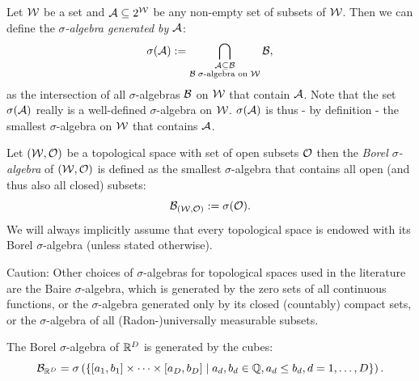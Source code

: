 \begin{Def}
    \label{def-sigma-algebra-gen}
    Let $\mathcal{W}$ be a set and $\mathcal{A} \subseteq 2^{\mathcal{W}}$ be any non-empty set of subsets of $\mathcal{W}$.
    Then we can define the \emph{$\sigma$-algebra generated by $\mathcal{A}$}:
    \[ \sigma(\mathcal{A}) := \bigcap_{\substack{ \mathcal{A} \subseteq \mathcal{B} \\\mathcal{B}\; \sigma\text{-algebra on }\mathcal{W} }} \mathcal{B}, \]
    as the intersection of all $\sigma$-algebras $\mathcal{B}$ on $\mathcal{W}$ that contain $\mathcal{A}$. 
    Note that the set $\sigma(\mathcal{A})$ really is a well-defined $\sigma$-algebra on $\mathcal{W}$. %
    $\sigma(\mathcal{A})$ is thus - by definition - the smallest $\sigma$-algebra on $\mathcal{W}$ that contains $\mathcal{A}$.
\end{Def}


\begin{Def}
    Let $(\mathcal{W},\mathcal{O})$ be a topological space with set of open subsets $\mathcal{O}$ then the \emph{Borel $\sigma$-algebra} of $(\mathcal{W},\mathcal{O})$ is 
    defined as the smallest $\sigma$-algebra that contains all open (and thus also all closed) subsets:
    \[ \mathcal{B}_{(\mathcal{W},\mathcal{O})} := \sigma(\mathcal{O}).\]
    We will always implicitly assume that every topological space is endowed with its Borel $\sigma$-algebra (unless stated otherwise).
\end{Def}

\begin{Rem}
    Caution: Other choices of $\sigma$-algebras for topological spaces used in the literature are the Baire $\sigma$-algebra, which is generated by the zero sets of all continuous functions, or the $\sigma$-algebra generated only by its closed (countably) compact sets, or the $\sigma$-algebra of all (Radon-)universally measurable subsets.
\end{Rem}

\begin{Lem}[Borel $\sigma$-algebra on $\R^D$]    
    The Borel $\sigma$-algebra of $\R^D$ is generated by the cubes:
\[ \mathcal{B}_{\mathbb{R}^D} = \sigma\left (\left \{ [a_1,b_1] \times \cdots \times [a_D,b_D]\;|\; a_d, b_d \in \mathbb{Q}, a_d \le b_d, d=1,\dots,D    \right \}\right ).  \]
\end{Lem}

